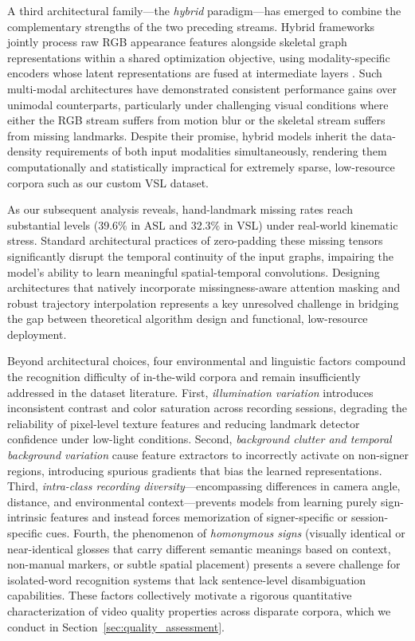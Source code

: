 \documentclass{ieeeaccess}
\begin{document}
A third architectural family—the \textit{hybrid} paradigm—has emerged to combine the complementary strengths of the two preceding streams. Hybrid frameworks jointly process raw RGB appearance features alongside skeletal graph representations within a shared optimization objective, using modality-specific encoders whose latent representations are fused at intermediate layers \cite{yin2020signbert}. Such multi-modal architectures have demonstrated consistent performance gains over unimodal counterparts, particularly under challenging visual conditions where either the RGB stream suffers from motion blur or the skeletal stream suffers from missing landmarks. Despite their promise, hybrid models inherit the data-density requirements of both input modalities simultaneously, rendering them computationally and statistically impractical for extremely sparse, low-resource corpora such as our custom VSL dataset.

As our subsequent analysis reveals, hand-landmark missing rates reach substantial levels (39.6$\%$ in ASL and 32.3$\%$ in VSL) under real-world kinematic stress. Standard architectural practices of zero-padding these missing tensors significantly disrupt the temporal continuity of the input graphs, impairing the model's ability to learn meaningful spatial-temporal convolutions. Designing architectures that natively incorporate missingness-aware attention masking and robust trajectory interpolation represents a key unresolved challenge in bridging the gap between theoretical algorithm design and functional, low-resource deployment.

Beyond architectural choices, four environmental and linguistic factors compound the recognition difficulty of in-the-wild corpora and remain insufficiently addressed in the dataset literature. First, \textit{illumination variation} introduces inconsistent contrast and color saturation across recording sessions, degrading the reliability of pixel-level texture features and reducing landmark detector confidence under low-light conditions. Second, \textit{background clutter and temporal background variation} cause feature extractors to incorrectly activate on non-signer regions, introducing spurious gradients that bias the learned representations. Third, \textit{intra-class recording diversity}—encompassing differences in camera angle, distance, and environmental context—prevents models from learning purely sign-intrinsic features and instead forces memorization of signer-specific or session-specific cues. Fourth, the phenomenon of \textit{homonymous signs} (visually identical or near-identical glosses that carry different semantic meanings based on context, non-manual markers, or subtle spatial placement) presents a severe challenge for isolated-word recognition systems that lack sentence-level disambiguation capabilities. These factors collectively motivate a rigorous quantitative characterization of video quality properties across disparate corpora, which we conduct in Section~\ref{sec:quality_assessment}.
\end{document}
